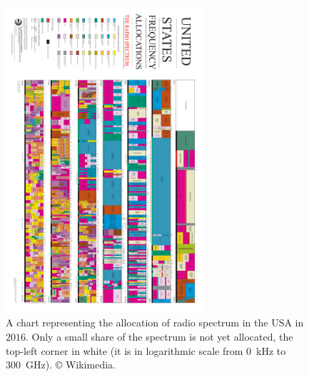 \begin{figure}[h!]
    \centering
    \includegraphics[width=0.65\textwidth,angle=90]{United_States_Frequency_Allocations_Chart_2016_The_Radio_Spectrum.pdf}
    \caption{A chart representing the allocation of radio spectrum in the USA in $2016$. Only a small share of the spectrum is not yet allocated, the top-left corner in white (it is in logarithmic scale from \SI{0}{\kilo\hertz} to \SI{300}{\giga\hertz}). \copyright{} Wikimedia.}
    \label{fig:1:United_States_Frequency_Allocations_Chart_2016_The_Radio_Spectrum}
\end{figure}


